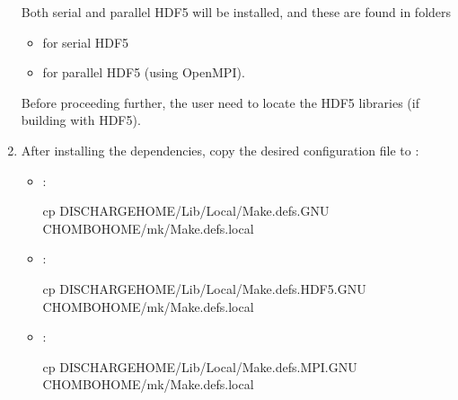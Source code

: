 \documentclass[letterpaper,10pt,english]{sphinxmanual}
\begin{document}
\begin{enumerate}
\begin{itemize}
\end{itemize}

\sphinxAtStartPar
Both serial and parallel HDF5 will be installed, and these are  found in folders
\begin{itemize}
\item {} 
\sphinxAtStartPar
{} for serial HDF5

\item {} 
\sphinxAtStartPar
{} for parallel HDF5 (using OpenMPI).

\end{itemize}

\sphinxAtStartPar
Before proceeding further, the user need to locate the HDF5 libraries (if building with HDF5).

\item {} 
\sphinxAtStartPar
After installing the dependencies, copy the desired configuration file to :
\begin{itemize}
\item {} 
\sphinxAtStartPar
{}:

\begin{sphinxVerbatim}[commandchars=\\\{\},formatcom=\scriptsize]
cp \PYGZdl{}DISCHARGE\PYGZus{}HOME/Lib/Local/Make.defs.GNU \PYGZdl{}CHOMBO\PYGZus{}HOME/mk/Make.defs.local
\end{sphinxVerbatim}

\item {} 
\sphinxAtStartPar
{}:

\begin{sphinxVerbatim}[commandchars=\\\{\},formatcom=\scriptsize]
cp \PYGZdl{}DISCHARGE\PYGZus{}HOME/Lib/Local/Make.defs.HDF5.GNU \PYGZdl{}CHOMBO\PYGZus{}HOME/mk/Make.defs.local
\end{sphinxVerbatim}

\item {} 
\sphinxAtStartPar
{}:

\begin{sphinxVerbatim}[commandchars=\\\{\},formatcom=\scriptsize]
cp \PYGZdl{}DISCHARGE\PYGZus{}HOME/Lib/Local/Make.defs.MPI.GNU \PYGZdl{}CHOMBO\PYGZus{}HOME/mk/Make.defs.local
\end{sphinxVerbatim}


\end{itemize}
\end{enumerate}
\end{document}
